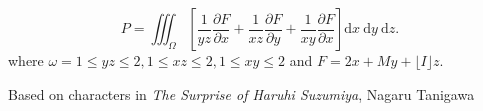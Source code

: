 \documentclass[12pt]{article}
\begin{document}
\begin{equation*}
    P=\iiint_{\Omega}\left[\frac{1}{y z} \frac{\partial F}{\partial x}+\frac{1}{x z} \frac{\partial F}{\partial y}+\frac{1}{x y} \frac{\partial F}{\partial x}\right] \mathrm{d} x \mathrm{~d} y \mathrm{~d} z. 
\end{equation*}
where $\omega=1 \leqslant y z \leqslant 2,1 \leqslant x z \leqslant 2,1 \leqslant x y \leqslant 2$ and $F=2 x + M y + \lfloor I \rfloor z$. 

\begin{flushright}
    Based on characters in \textsl{The Surprise of Haruhi Suzumiya}, Nagaru Tanigawa
\end{flushright}

\newpage
\end{document}
